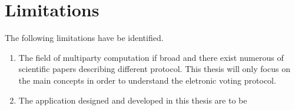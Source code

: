 \section{Limitations}

The following limitations have be identified.

\begin{enumerate}
    \item The field of multiparty computation if broad and there exist numerous of scientific papers describing different protocol. This thesis will only focus on the main concepts in order to understand
    the eletronic voting protocol. 
    
    \item The application designed and developed in this thesis are to be 
\end{enumerate}
